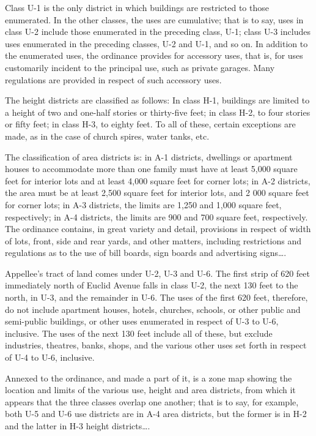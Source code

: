 Class U-1 is the only district in which buildings are restricted to those
enumerated. In the other classes, the uses are cumulative; that is to say, uses
in class U-2 include those enumerated in the preceding class, U-1; class U-3
includes uses enumerated in the preceding classes, U-2 and U-1, and so on. In
addition to the enumerated uses, the ordinance provides for accessory uses, that
is, for uses customarily incident to the principal use, such as private garages.
Many regulations are provided in respect of such accessory uses.

The height districts are classified as follows: In class H-1, buildings are
limited to a height of two and one-half stories or thirty-five feet; in class
H-2, to four stories or fifty feet; in class H-3, to eighty feet. To all of
these, certain exceptions are made, as in the case of church spires, water
tanks, etc.

The classification of area districts is: in A-1 districts, dwellings or
apartment houses to accommodate more than one family must have at least 5,000
square feet for interior lots and at least 4,000 square feet for corner lots; in
A-2 districts, the area must be at least 2,500 square feet for interior lots,
and 2 000 square feet for corner lots; in A-3 districts, the limits are 1,250
and 1,000 square feet, respectively; in A-4 districts, the limits are 900 and
700 square feet, respectively. The ordinance contains, in great variety and
detail, provisions in respect of width of lots, front, side and rear yards, and
other matters, including restrictions and regulations as to the use of bill
boards, sign boards and advertising signs\ldots .

Appellee's tract of land comes under U-2, U-3 and U-6. The first strip of 620
feet immediately north of Euclid Avenue falls in class U-2, the next 130 feet to
the north, in U-3, and the remainder in U-6. The uses of the first 620 feet,
therefore, do not include apartment houses, hotels, churches, schools, or other
public and semi-public buildings, or other uses enumerated in respect of U-3 to
U-6, inclusive. The uses of the next 130 feet include all of these, but exclude
industries, theatres, banks, shops, and the various other uses set forth in
respect of U-4 to U-6, inclusive. 

Annexed to the ordinance, and made a part of it, is a zone map showing the
location and limits of the various use, height and area districts, from which it
appears that the three classes overlap one another; that is to say, for example,
both U-5 and U-6 use districts are in A-4 area districts, but the former is in
H-2 and the latter in H-3 height districts\ldots .

